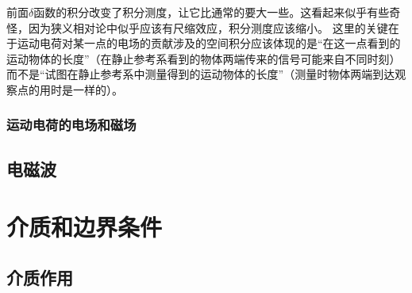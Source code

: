 \documentclass[UTF8, a4paper]{ctexart}
\begin{document}
前面$\delta$函数的积分改变了积分测度，让它比通常的要大一些。这看起来似乎有些奇怪，因为狭义相对论中似乎应该有尺缩效应，积分测度应该缩小。
这里的关键在于运动电荷对某一点的电场的贡献涉及的空间积分应该体现的是“在这一点看到的运动物体的长度”（在静止参考系看到的物体两端传来的信号可能来自不同时刻）而不是“试图在静止参考系中测量得到的运动物体的长度”（测量时物体两端到达观察点的用时是一样的）。

\subsubsection{运动电荷的电场和磁场}



\subsection{电磁波}

\section{介质和边界条件}

\subsection{介质作用}
\end{document}
